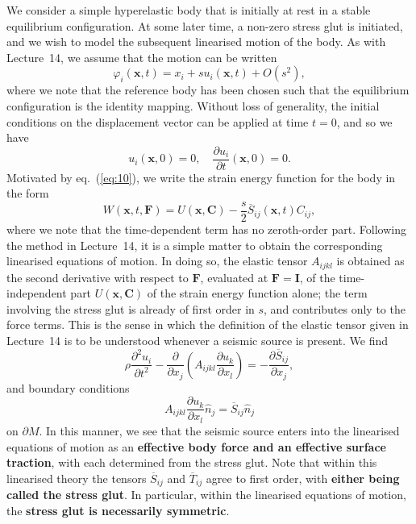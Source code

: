 We consider a simple hyperelastic body that is initially at rest in a stable equilibrium configuration. At some 
later time, a non-zero stress glut is initiated, and we wish to model the subsequent linearised motion of the body. As 
with Lecture~14, we assume that the motion can be written
\begin{equation}\label{eq:13}
\varphi_{i}(\mathbf{x}, t) = x_{i} + s u_{i}(\mathbf{x}, t) + O(s^2),
\end{equation}
where we note that the reference body has been chosen such that the equilibrium configuration is the identity mapping. 
Without loss of generality, the initial conditions on the displacement vector can be applied at time $t=0$, and so we have
\begin{equation}\label{eq:14}
u_{i}(\mathbf{x}, 0) = 0,\quad \frac{\partial u_{i}}{\partial t}(\mathbf{x}, 0) = 0.
\end{equation}
Motivated by eq.~(\ref{eq:10}), we write the strain energy function for the body in the form
\begin{equation}\label{eq:15}
W(\mathbf{x}, t, \mathbf{F}) = U(\mathbf{x}, \mathbf{C}) - \frac{s}{2}\overline{S}_{ij}(\mathbf{x}, t)C_{ij},
\end{equation}
where we note that the time-dependent term has no zeroth-order part. Following the method in Lecture~14, it is a simple 
matter to obtain the corresponding linearised equations of motion. In doing so, the elastic tensor $A_{ijkl}$ is obtained as the second 
derivative with respect to $\mathbf{F}$, evaluated at $\mathbf{F}=\mathbf{I}$, of the time-independent part $U(\mathbf{x},\mathbf{C})$ of 
the strain energy function alone; the term involving the stress glut is already of first order in $s$, and contributes only to 
the force terms. This is the sense in which the definition of the elastic tensor given in Lecture~14 is to be understood 
whenever a seismic source is present. We find
\begin{equation}\label{eq:16}
\rho\frac{\partial^2 u_{i}}{\partial t^2} - \frac{\partial}{\partial x_{j}}\left(A_{ijkl}\frac{\partial u_{k}}{\partial x_{l}}\right) = -\frac{\partial\overline{S}_{ij}}{\partial x_{j}},
\end{equation}
and boundary conditions 
\begin{equation}\label{eq:17}
A_{ijkl}\frac{\partial u_{k}}{\partial x_{l}}\hat{n}_{j} = \overline{S}_{ij}\hat{n}_{j}
\end{equation}
on $\partial M$. In this manner, we see that the seismic source enters into the linearised equations of motion as an 
\textbf{effective body force and an effective surface traction}, with 
each determined from the stress glut. Note that within this linearised theory the tensors $\overline{S}_{ij}$ and 
$\overline{T}_{ij}$ agree to first order, with \textbf{either being called the stress glut}.
In particular, within the linearised equations of motion, the \textbf{stress glut is necessarily symmetric}.

